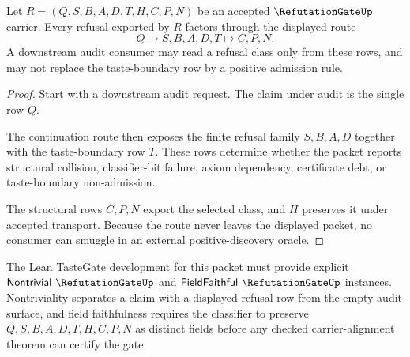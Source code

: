 \begin{theorem}
\label{thm:refutation-gate-finite-refusal-routing}
Let $R=(Q,S,B,A,D,T,H,C,P,N)$ be an accepted $\RefutationGateUp$ carrier. Every refusal exported by $R$ factors through the displayed route
$$
Q \longmapsto S,B,A,D,T \longmapsto C,P,N .
$$
A downstream audit consumer may read a refusal class only from these rows, and may not replace the taste-boundary row by a positive admission rule.
\end{theorem}
\begin{proof}
Start with a downstream audit request. The claim under audit is the single row $Q$.

The continuation route then exposes the finite refusal family $S,B,A,D$ together with the taste-boundary row $T$. These rows determine whether the packet reports structural collision, classifier-bit failure, axiom dependency, certificate debt, or taste-boundary non-admission.

The structural rows $C,P,N$ export the selected class, and $H$ preserves it under accepted transport. Because the route never leaves the displayed packet, no consumer can smuggle in an external positive-discovery oracle.
\end{proof}

The Lean TasteGate development for this packet must provide explicit $\mathsf{Nontrivial}\ \RefutationGateUp$ and $\mathsf{FieldFaithful}\ \RefutationGateUp$ instances. Nontriviality separates a claim with a displayed refusal row from the empty audit surface, and field faithfulness requires the classifier to preserve $Q,S,B,A,D,T,H,C,P,N$ as distinct fields before any checked carrier-alignment theorem can certify the gate.


\begin{closurestatus}{\RefutationGateUp}
  \theoryclosure{\seedClosure}
  \formalstatus{\theoremCheckedV}
\end{closurestatus}
